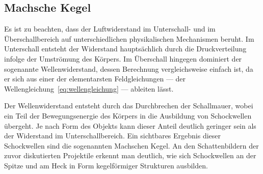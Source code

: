 \subsection{Machsche Kegel}
Es ist zu beachten, dass der Luftwiderstand im Unterschall- und im Überschallbereich 
auf unterschiedlichen physikalischen Mechanismen beruht.
Im Unterschall entsteht der Widerstand hauptsächlich durch die Druckverteilung infolge der Umströmung des Körpers. 
Im Überschall hingegen dominiert der sogenannte Wellenwiderstand, 
dessen Berechnung vergleichsweise einfach ist, 
da er sich aus einer der elementarsten Feldgleichungen 
— der Wellengleichung~\eqref{eq:wellengleichung} — ableiten lässt.

Der Wellenwiderstand entsteht durch das Durchbrechen 
der Schallmauer, wobei ein Teil der Bewegungsenergie 
des Körpers in die Ausbildung von Schockwellen übergeht.
Je nach Form des Objekts kann dieser Anteil deutlich 
geringer sein als der Widerstand im Unterschallbereich.
Ein sichtbares Ergebnis dieser Schockwellen sind die 
sogenannten Machschen Kegel.
An den Schattenbildern der zuvor diskutierten Projektile 
erkennt man deutlich,
wie sich Schockwellen an der Spitze und am Heck 
in Form kegelförmiger Strukturen ausbilden.
